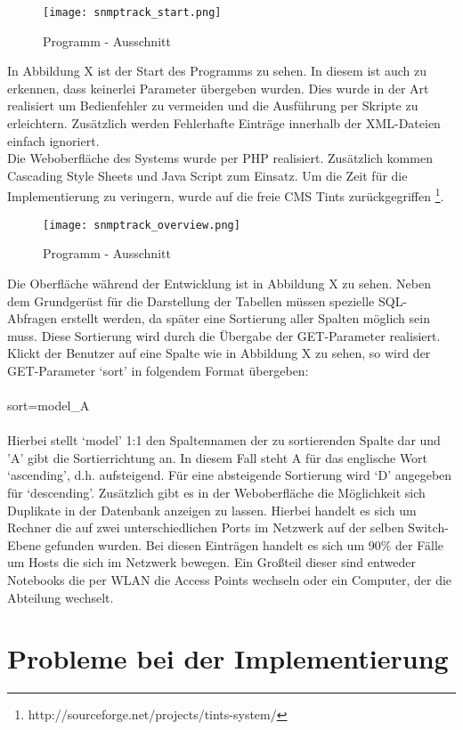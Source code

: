 \begin{figure}[H]
\centering
\texttt{[image: snmptrack\_start.png]}
\caption{Programm - Ausschnitt}
\label{fig:show_s1_s2_p1_n1}
\end{figure}
In Abbildung X ist der Start des Programms zu sehen. In diesem ist auch zu erkennen, dass keinerlei Parameter übergeben wurden. Dies wurde in der Art realisiert um Bedienfehler zu vermeiden und die Ausführung per Skripte zu erleichtern. Zusätzlich werden Fehlerhafte Einträge innerhalb der XML-Dateien einfach ignoriert.\\
Die Weboberfläche des Systems wurde per PHP realisiert. Zusätzlich kommen Cascading Style Sheets und Java Script zum Einsatz. Um die Zeit für die Implementierung zu veringern, wurde auf die freie CMS Tints zurückgegriffen \footnote{http://sourceforge.net/projects/tints-system/}.
\\
\begin{figure}[H]
\centering
\texttt{[image: snmptrack\_overview.png]}
\caption{Programm - Ausschnitt}
\label{fig:show_s1_s2_p1_n1}
\end{figure}
Die Oberfläche während der Entwicklung ist in Abbildung X zu sehen.
Neben dem Grundgerüst für die Darstellung der Tabellen müssen spezielle SQL-Abfragen erstellt werden, da später eine Sortierung aller Spalten möglich sein muss.
Diese Sortierung wird durch die Übergabe der GET-Parameter realisiert. Klickt der Benutzer auf eine Spalte wie in Abbildung X zu sehen, so wird der GET-Parameter ‘sort’ in folgendem Format übergeben:\\
\\
sort=model\_A\\
\\
Hierbei stellt ‘model’ 1:1 den Spaltennamen der zu sortierenden Spalte dar und 'A' gibt die Sortierrichtung an. In diesem Fall steht A für das englische Wort ‘ascending’, d.h. aufsteigend. Für eine absteigende Sortierung wird ‘D’ angegeben für ‘descending’.
Zusätzlich gibt es in der Weboberfläche die Möglichkeit sich Duplikate in der Datenbank anzeigen zu lassen. Hierbei handelt es sich um Rechner die auf zwei unterschiedlichen Ports im Netzwerk auf der selben Switch-Ebene gefunden wurden. Bei diesen Einträgen handelt es sich um 90\% der Fälle um Hosts die sich im Netzwerk bewegen. Ein Großteil dieser sind entweder Notebooks die per WLAN die Access Points wechseln oder ein Computer, der die Abteilung wechselt.

\section{Probleme bei der Implementierung}
\label{sec:probimp}

